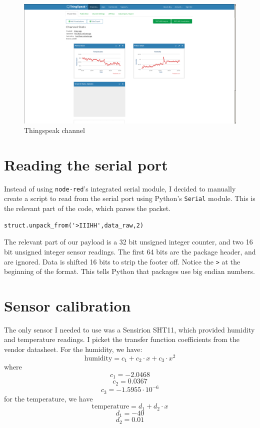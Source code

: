 \documentclass[11pt]{article}
\begin{document}
\begin{figure}
\includegraphics[width=\textwidth]{thingspeak}
\caption{Thingspeak channel}
\label{fig:thingspeak}
\end{figure}

\section{Reading the serial port}
Instead of using \texttt{node-red}'s integrated serial module, I decided to manually create a script to read from the serial port using Python's \texttt{Serial} module. This is the relevant part of the code, which parses the packet. 

\begin{lstlisting}
struct.unpack_from('>IIIHH',data_raw,2)
\end{lstlisting}

The relevant part of our payload is a 32 bit unsigned integer counter, and two 16 bit unsigned integer sensor readings. The first 64 bits are the package header, and are ignored. Data is shifted 16 bits to strip the footer off. Notice the \texttt{>} at the beginning of the format. This tells Python that packages use big endian numbers.

\section{Sensor calibration}
The only sensor I needed to use was a Sensirion SHT11, which provided humidity and temperature readings. I picket the transfer function coefficients from the vendor datasheet. For the humidity, we have:
$$\text{humidity}=c_1+c_2\cdot x +c_3\cdot x^2$$
where
$$c_1= -2.0468$$
$$c_2=  0.0367$$
$$c_3= -1.5955\cdot10^{-6}$$
for the temperature, we have
$$\text{temperature}=d_1+d_2\cdot x$$ 
$$d_1= -40$$
$$d_2=  0.01$$
\end{document}
